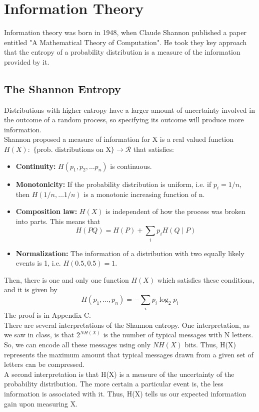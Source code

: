 \documentclass[letterpaper,10pt,english]{article}
\begin{document}
\section{Information Theory} 
Information theory was born in 1948, when Claude Shannon published a paper entitled "A Mathematical Theory of Computation". He took they key approach that the entropy of a probability distribution is a measure of the information provided by it. 
\subsection{The Shannon Entropy}
Distributions with higher entropy have a larger amount of uncertainty involved in the outcome of a random process, so specifying its outcome will produce more information. \\
Shannon proposed a measure of information for X is a real valued function $H(X): {\text{ \{prob. distributions on X\} }} \rightarrow \mathcal{R}$ that satisfies:
\begin{itemize}
\item \textbf{Continuity:} $H(p_1, p_2, \ldots p_n)$ is continuous. 
\item \textbf{Monotonicity:} If the probability distribution is uniform, i.e. if $p_i=1/n$, then $H(1/n, \ldots 1/n)$ is a monotonic increasing function of n. 
\item \textbf{Composition law:} $H(X)$ is independent of how the process was broken into parts. This means that 
\begin{equation*}
H(PQ)=H(P)+\sum_i p_i H(Q \mid P)
\end{equation*}
\item \textbf{Normalization:} The information of a distribution with two equally likely events is 1, i.e. $H(0.5, 0.5)=1$. 
\end{itemize}
Then, there is one and only one function $H(X)$ which satisfies these conditions, and it is given by 
\begin{equation}
H(p_1 , \ldots , p_n)=-\sum_i {p_i \log_2 p_i}
\end{equation}
 The proof is in Appendix C. \\
There are several interpretations of the Shannon entropy. One interpretation, as we saw in class, is that $2^{NH(X)}$ is the number of typical messages with N letters. So, we can encode all these messages using only $NH(X)$ bits. Thus, H(X) represents the maximum amount that typical messages drawn from a  given set of letters can be compressed. \\
A second interpretation is that H(X) is a measure of the uncertainty of the probability distribution. The more certain a particular event is, the less information is associated with it. Thus, H(X) tells us our expected information gain upon measuring X. 
\end{document}
